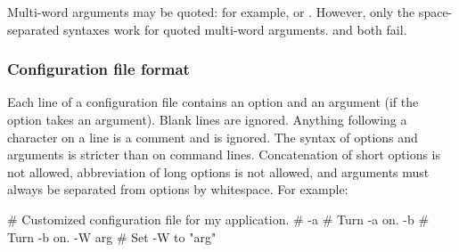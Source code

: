 Multi-word arguments may be quoted: for example,  or . However, only the space-separated
syntaxes work for quoted multi-word arguments.  and  both fail.

   \subsubsection{Configuration file format}

Each line of a configuration file contains an option and an argument
(if the option takes an argument). Blank lines are ignored.  Anything
following a \ccode{\#} character on a line is a comment and is
ignored. The syntax of options and arguments is stricter than on
command lines.  Concatenation of short options is not allowed,
abbreviation of long options is not allowed, and arguments must always
be separated from options by whitespace. For example:

\begin{cchunk}
   # Customized configuration file for my application.
   #
   -a             # Turn -a on.
   -b             # Turn -b on.
   -W arg         # Set -W to "arg"
\end{cchunk}



